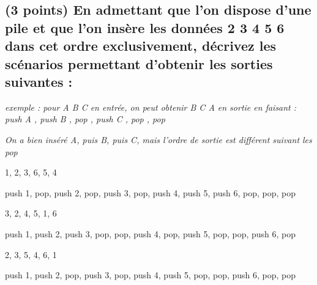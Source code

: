 \documentclass[11pt,a4paper]{article}
\begin{document}


\clearpage

\subsection{(3 points) En admettant que l'on dispose d'une pile et que l'on insère les données  2 3 4 5 6 \fg{} dans cet ordre exclusivement, décrivez les scénarios permettant d'obtenir les sorties suivantes : }


\medskip

\begin{center}
\noindent \textit{exemple : pour \og A B C \fg{} en entrée, on peut obtenir \og B C A \fg{} en sortie en faisant : \linebreak
\og push A \fg, \og push B \fg, \og pop \fg, \og push C \fg, \og pop \fg, \og pop \fg }

\noindent \textit{On a bien inséré A, puis B, puis C, mais l'ordre de sortie est différent suivant les \og pop \fg}
\end{center}

\medskip



\begin{center}

\begin{large}
1, 2, 3, 6, 5, 4
\end{large}

\begin{center}
 push 1, pop, push 2, pop, push 3, pop, push 4, push 5, push 6, pop, pop, pop
\end{center}


\begin{large}
3, 2, 4, 5, 1, 6
\end{large}

\begin{center}
 push 1, push 2, push 3, pop, pop, push 4, pop, push 5, pop, pop, push 6, pop
\end{center}


\begin{large}
2, 3, 5, 4, 6, 1
\end{large}

\begin{center}
 push 1, push 2, pop, push 3, pop, push 4, push 5, pop, pop, push 6, pop, pop
\end{center}

\end{center}
\end{document}
